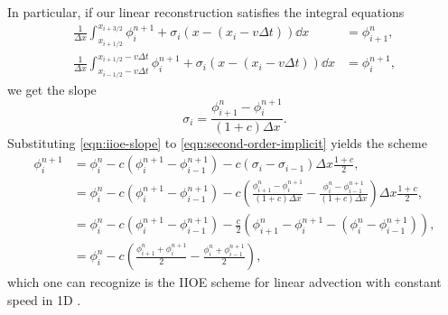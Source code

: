 \documentclass[../thesis.tex]{subfiles}
\begin{document}
In particular, if our linear reconstruction satisfies the integral equations
\begin{equation}
    \begin{split}
        \frac{1}{\Delta x}
        \int_{x_{i+1/2}}^{x_{i+3/2}}
        \phi_{i}^{n+1} + \sigma_{i}
        \left( x - (x_{i}-v\Delta t) \right)\dd{x}
        &= \phi_{i+1}^{n},
        \\
        \frac{1}{\Delta x}
        \int_{x_{i-1/2}-v\Delta t}^{x_{i+1/2}-v\Delta t}
        \phi_{i}^{n+1} + \sigma_{i}
        \left( x - (x_{i}-v\Delta t) \right)\dd{x}
        &= \phi_{i}^{n+1},
    \end{split}
\end{equation}
we get the slope
\begin{equation}
    \label{eqn:iioe-slope}
    \sigma_{i} = \frac{\phi_{i+1}^{n} - \phi_{i}^{n+1}}{(1+c)\Delta x}.
\end{equation}
Substituting \eqref{eqn:iioe-slope} to \eqref{eqn:second-order-implicit} yields the scheme
\begin{equation}\label{eqn:iioe-1d}
    \begin{split}
        \phi_{i}^{n+1}
        &= \phi_{i}^{n} - c\left(
            \phi_{i}^{n+1}
            - \phi_{i-1}^{n+1}
            \right)
            -c\left(
            \sigma_{i} - \sigma_{i-1}
            \right)\Delta x\frac{1+c}{2},
        \\
        &= \phi_{i}^{n} - c\left(
            \phi_{i}^{n+1}
            - \phi_{i-1}^{n+1}
            \right)
            -c\left(
                \frac{\phi_{i+1}^{n} - \phi_{i}^{n+1}}{(1+c)\Delta x}
                - \frac{\phi_{i}^{n} - \phi_{i-1}^{n+1}}{(1+c)\Delta x}
            \right)\Delta x\frac{1+c}{2},
        \\
        &= \phi_{i}^{n} - c\left(
            \phi_{i}^{n+1}
            - \phi_{i-1}^{n+1}
            \right)
            -\frac{c}{2}\left(
                \phi_{i+1}^{n} - \phi_{i}^{n+1}
                - (\phi_{i}^{n} - \phi_{i-1}^{n+1})
            \right),
        \\
        &= \phi_{i}^{n}
            -c\left(
                \frac{\phi_{i+1}^{n} + \phi_{i}^{n+1}}{2}
                - \frac{\phi_{i}^{n} + \phi_{i-1}^{n+1}}{2}
            \right),
    \end{split}
\end{equation}
which one can recognize is the IIOE scheme for linear advection with constant speed in 1D \cite{2014_Mikula,2018_Frolkovic,2020_Ibolya_CONF}.
\end{document}
